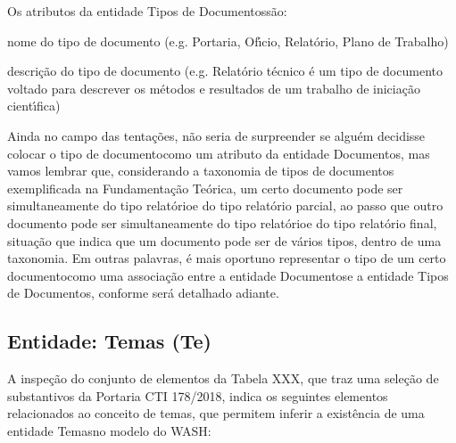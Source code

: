 \documentclass[
12pt,		%
openright,	%
twoside,  %
a4paper,			%
chapter=TITLE,		%
english,			%
french,				%
spanish,			%
brazil				%
]{USPSC-classe/USPSC}
\begin{document}
Os atributos da entidade \textquotedbl Tipos de Documentos\textquotedbl  s\~ao:











\begin{alineas}
\item nome do tipo de documento (e.g. Portaria, Of\'{\i}cio, Relat\'orio, Plano de Trabalho)
\item descri\c{c}\~ao do tipo de documento (e.g. \textquotedbl Relat\'orio t\'ecnico \'e um tipo de documento voltado para descrever os m\'etodos e resultados de um trabalho de inicia\c{c}\~ao cient\'{\i}fica\textquotedbl )
\end{alineas}

Ainda no campo das \textquotedbl tenta\c{c}\~oes\textquotedbl , n\~ao seria de surpreender se algu\'em decidisse colocar o \textquotedbl tipo de documento\textquotedbl  como um atributo da entidade \textquotedbl Documentos\textquotedbl , mas vamos lembrar que, considerando a taxonomia de tipos de documentos exemplificada na Fundamenta\c{c}\~ao Te\'orica, um certo documento pode ser simultaneamente do tipo \textquotedbl relat\'orio\textquotedbl  e do tipo \textquotedbl relat\'orio parcial\textquotedbl , ao passo que outro documento pode ser simultaneamente do tipo \textquotedbl relat\'orio\textquotedbl  e do tipo \textquotedbl relat\'orio final\textquotedbl , situa\c{c}\~ao que indica que um documento pode ser de v\'arios tipos, dentro de uma taxonomia. Em outras palavras, \'e mais oportuno representar o \textquotedbl tipo de um certo documento\textquotedbl  como uma associa\c{c}\~ao entre a entidade \textquotedbl Documentos\textquotedbl  e a entidade \textquotedbl Tipos de Documentos\textquotedbl , conforme ser\'a detalhado adiante.










\subsection[Entidade: Temas (Te)]{Entidade: Temas (Te)}\label{Entidade: Temas (Te)}
A inspe\c{c}\~ao do conjunto de elementos da Tabela XXX, que traz uma sele\c{c}\~ao de substantivos da Portaria CTI 178/2018, indica os seguintes elementos relacionados ao conceito de \textquotedbl temas\textquotedbl , que permitem inferir a exist\^encia de uma entidade \textquotedbl Temas\textquotedbl  no modelo do WASH:
\end{document}
